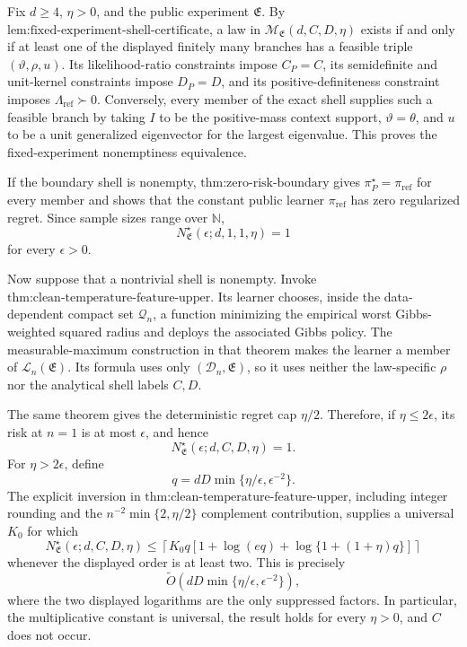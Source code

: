 Fix \(d\ge4\), \(\eta>0\), and the public experiment \(\mathfrak E\). By \(\text{lem:fixed-experiment-shell-certificate}\), a law in \(\mathcal M_{\mathfrak E}(d,C,D,\eta)\) exists if and only if at least one of the displayed finitely many branches has a feasible triple \((\vartheta,\rho,u)\). Its likelihood-ratio constraints impose \(C_P=C\), its semidefinite and unit-kernel constraints impose \(D_P=D\), and its positive-definiteness constraint imposes \(\Lambda_{\mathrm{ref}}\succ0\). Conversely, every member of the exact shell supplies such a feasible branch by taking \(I\) to be the positive-mass context support, \(\vartheta=\theta\), and \(u\) to be a unit generalized eigenvector for the largest eigenvalue. This proves the fixed-experiment nonemptiness equivalence.

If the boundary shell is nonempty, \(\text{thm:zero-risk-boundary}\) gives \(\pi_P^\star=\pi_{\mathrm{ref}}\) for every member and shows that the constant public learner \(\pi_{\mathrm{ref}}\) has zero regularized regret. Since sample sizes range over \(\mathbb N\),
\[
N^\star_{\mathfrak E}(\epsilon;d,1,1,\eta)=1
\]
for every \(\epsilon>0\).

Now suppose that a nontrivial shell is nonempty. Invoke \(\text{thm:clean-temperature-feature-upper}\). Its learner chooses, inside the data-dependent compact set \(\mathcal Q_n\), a function minimizing the empirical worst Gibbs-weighted squared radius and deploys the associated Gibbs policy. The measurable-maximum construction in that theorem makes the learner a member of \(\mathcal L_n(\mathfrak E)\). Its formula uses only \((\mathcal D_n,\mathfrak E)\), so it uses neither the law-specific \(\rho\) nor the analytical shell labels \(C,D\).

The same theorem gives the deterministic regret cap \(\eta/2\). Therefore, if \(\eta\le2\epsilon\), its risk at \(n=1\) is at most \(\epsilon\), and hence
\[
N^\star_{\mathfrak E}(\epsilon;d,C,D,\eta)=1.
\]
For \(\eta>2\epsilon\), define
\[
q=dD\min\{\eta/\epsilon,\epsilon^{-2}\}.
\]
The explicit inversion in \(\text{thm:clean-temperature-feature-upper}\), including integer rounding and the \(n^{-2}\min\{2,\eta/2\}\) complement contribution, supplies a universal \(K_0\) for which
\[
N^\star_{\mathfrak E}(\epsilon;d,C,D,\eta)
\le
\left\lceil K_0q\left[1+\log(eq)+\log\{1+(1+\eta)q\}\right]\right\rceil
\]
whenever the displayed order is at least two. This is precisely
\[
\widetilde O\!\left(dD\min\{\eta/\epsilon,\epsilon^{-2}\}\right),
\]
where the two displayed logarithms are the only suppressed factors. In particular, the multiplicative constant is universal, the result holds for every \(\eta>0\), and \(C\) does not occur.

